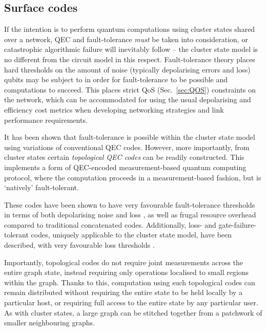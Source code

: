 \subsection{Surface codes}\label{sec:surface_codes}


If the intention is to perform quantum computations using cluster states shared over a network, QEC and fault-tolerance \textit{must} be taken into consideration, or catastrophic algorithmic failure will inevitably follow -- the cluster state model is no different from the circuit model in this respect. Fault-tolerance theory places hard thresholds on the amount of noise (typically depolarising errors and loss) qubits may be subject to in order for fault-tolerance to be possible and computations to succeed. This places strict QoS (Sec.~\ref{sec:QOS}) constraints on the network, which can be accommodated for using the usual depolarising and efficiency cost metrics when developing networking strategies and link performance requirements.

It has been shown that fault-tolerance is possible within the cluster state model \cite{bib:NielsenDawson04, bib:Dawson06} using variations of conventional QEC codes. However, more importantly, from cluster states certain \textit{topological QEC codes} \cite{???} can be readily constructed. This implements a form of QEC-encoded measurement-based quantum computing protocol, where the computation proceeds in a measurement-based fashion, but is `natively' fault-tolerant.

These codes have been shown to have very favourable fault-tolerance thresholds in terms of both depolarising noise and loss \cite{bib:StaceBarrettDohertyLoss, bib:BarrettStaceFT}, as well as frugal resource overhead compared to traditional concatenated codes. Additionally, loss- and gate-failure-tolerant codes, uniquely applicable to the cluster state model, have been described, with very favourable loss thresholds \cite{bib:Varnava05, bib:RalphHayes05, bib:Duan05}. 

Importantly, topological codes do not require joint measurements across the entire graph state, instead requiring only operations localised to small regions within the graph. Thanks to this, computation using such topological codes can remain distributed without requiring the entire state to be held locally by a particular host, or requiring full access to the entire state by any particular user. As with cluster states, a large graph can be stitched together from a patchwork of smaller neighbouring graphs.

